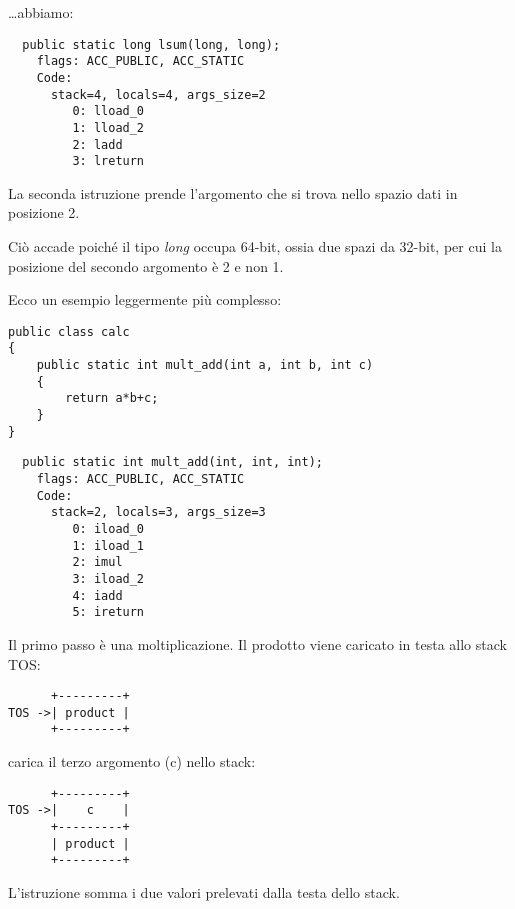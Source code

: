 \dots abbiamo:

\begin{lstlisting}
  public static long lsum(long, long);
    flags: ACC_PUBLIC, ACC_STATIC
    Code:
      stack=4, locals=4, args_size=2
         0: lload_0       
         1: lload_2       
         2: ladd          
         3: lreturn       
\end{lstlisting}

La seconda istruzione  prende l'argomento che si trova nello spazio dati in posizione 2.

Ciò accade poiché il tipo \emph{long} occupa 64-bit, ossia due spazi da 32-bit,
per cui la posizione del secondo argomento è 2 e non 1.


Ecco un esempio leggermente più complesso:


\begin{lstlisting}[style=customjava]
public class calc
{
	public static int mult_add(int a, int b, int c)
	{
		return a*b+c;
	}
}
\end{lstlisting}

\begin{lstlisting}
  public static int mult_add(int, int, int);
    flags: ACC_PUBLIC, ACC_STATIC
    Code:
      stack=2, locals=3, args_size=3
         0: iload_0       
         1: iload_1       
         2: imul          
         3: iload_2       
         4: iadd          
         5: ireturn       
\end{lstlisting}

Il primo passo è una moltiplicazione. Il prodotto viene caricato in testa allo stack \ac{TOS}:


\begin{lstlisting}
      +---------+
TOS ->| product |
      +---------+
\end{lstlisting}

 carica il terzo argomento (c) nello stack:

\begin{lstlisting}
      +---------+
TOS ->|    c    |
      +---------+
      | product |
      +---------+
\end{lstlisting}

L'istruzione  somma i due valori prelevati dalla testa dello stack.

